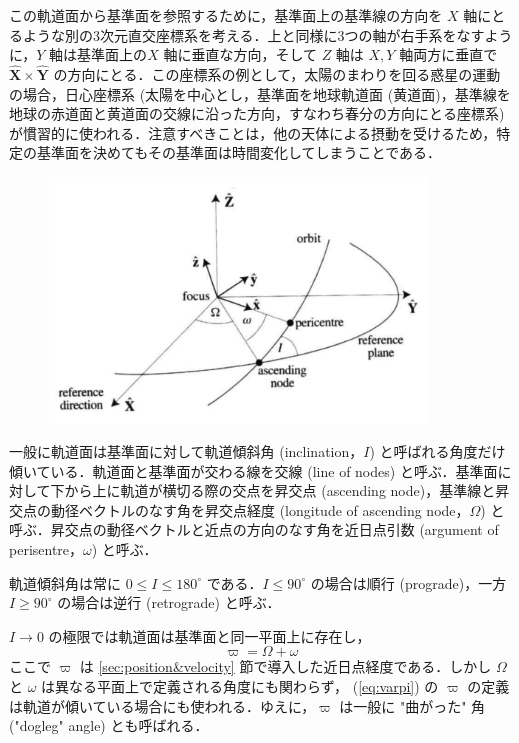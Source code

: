 \documentclass[11pt,a4paper,oneside,onecolumn]{jreport}
\begin{document}
この軌道面から基準面を参照するために，基準面上の基準線の方向を $X$ 軸にとるような別の3次元直交座標系を考える．上と同様に3つの軸が右手系をなすように，$Y$  軸は基準面上の$X$ 軸に垂直な方向，そして $Z$ 軸は $X, Y$ 軸両方に垂直で $\hat{\bm X} \times \hat{\bm Y}$ の方向にとる．この座標系の例として，太陽のまわりを回る惑星の運動の場合，日心座標系 (太陽を中心とし，基準面を地球軌道面 (黄道面)，基準線を地球の赤道面と黄道面の交線に沿った方向，すなわち春分の方向にとる座標系) が慣習的に使われる．注意すべきことは，他の天体による摂動を受けるため，特定の基準面を決めてもその基準面は時間変化してしまうことである．

\begin{figure}[H]
\centering
\includegraphics[width=10cm]{./image/sec2_13.pdf}
\caption{\label{fig:elements_SSD}}
\end{figure}

一般に軌道面は基準面に対して軌道傾斜角 (inclination，$I$) と呼ばれる角度だけ傾いている．軌道面と基準面が交わる線を交線 (line of nodes) と呼ぶ．基準面に対して下から上に軌道が横切る際の交点を昇交点 (ascending node)，基準線と昇交点の動径ベクトルのなす角を昇交点経度 (longitude of ascending node，$\Omega$) と呼ぶ．昇交点の動径ベクトルと近点の方向のなす角を近日点引数 (argument of perisentre，$\omega$) と呼ぶ．

軌道傾斜角は常に $0 \leq I \leq 180^{\circ}$ である．$I \leq 90 ^{\circ}$ の場合は順行 (prograde)，一方 $I \geq 90 ^{\circ}$ の場合は逆行 (retrograde) と呼ぶ．

$I \to 0$ の極限では軌道面は基準面と同一平面上に存在し，
\begin{equation}
\varpi = \Omega + \omega \label{eq:varpi}
\end{equation}
ここで $\varpi$ は \ref{sec:position&velocity} 節で導入した近日点経度である．しかし $\Omega$ と $\omega$ は異なる平面上で定義される角度にも関わらず， (\ref{eq:varpi}) の $\varpi$ の定義は軌道が傾いている場合にも使われる．ゆえに，$\varpi$ は一般に "曲がった" 角 ("dogleg" angle) とも呼ばれる．
\end{document}
